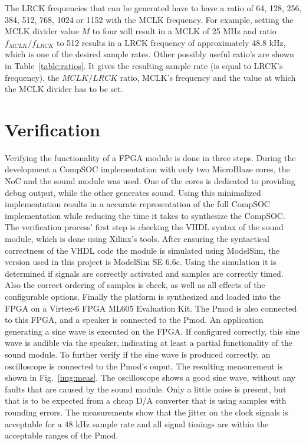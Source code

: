 The LRCK frequencies that can be generated have to have a ratio of 64, 128, 256, 384, 512, 768, 1024 or 1152 with the MCLK frequency. For example, setting the MCLK divider value $M$ to four will result in a MCLK of 25 MHz and ratio ${f_{MCLK}}/{f_{LRCK}}$ to 512 results in a LRCK frequency of approximately 48.8 kHz, which is one of the desired sample rates. Other possibly useful ratio's are shown in Table~\ref{table:ratios}. It gives the resulting sample rate (is equal to LRCK's frequency), the $MCLK/LRCK$ ratio, MCLK's frequency and the value at which the MCLK divider has to be set.

\section{Verification}\label{sec:verify}
Verifying the functionality of a FPGA module is done in three steps. During the development a CompSOC implementation with only two MicroBlaze cores, the NoC and the sound module was used. One of the cores is dedicated to providing debug output, while the other generates sound. Using this minimalized implementation results in a accurate representation of the full CompSOC implementation while reducing the time it takes to synthesize the CompSOC. The verification process' first step is checking the VHDL syntax of the sound module, which is done using Xilinx's tools. After ensuring the syntactical correctness of the VHDL code the module is simulated using ModelSim, the version used in this project is ModelSim SE 6.6c. Using the simulation it is determined if signals are correctly activated and samples are correctly timed. Also the correct ordering of samples is check, as well as all effects of the configurable options. Finally the platform is synthesized and loaded into the FPGA on a Virtex-6 FPGA ML605 Evaluation Kit. The Pmod is also connected to this FPGA, and a speaker is connected to the Pmod. An application generating a sine wave is executed on the FPGA. If configured correctly, this sine wave is audible via the speaker, indicating at least a partial functionality of the sound module. To further verify if the sine wave is produced correctly, an oscilloscope is connected to the Pmod's ouput. The resulting measurement is shown in Fig.~\ref{img:meas}. The oscilloscope shows a good sine wave, without any faults that are caused by the sound module. Only a little noise is present, but that is to be expected from a cheap D/A converter that is using samples with rounding errors. The measurements show that the jitter on the clock signals is acceptable for a 48 kHz sample rate and all signal timings are within the acceptable ranges of the Pmod.

